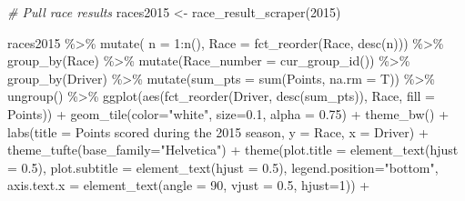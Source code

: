 \documentclass[
]{book}
\newenvironment{Shaded}{\begin{snugshade}}{\end{snugshade}}
\newcommand{\AttributeTok}[1]{\textcolor[rgb]{0.77,0.63,0.00}{#1}}
\newcommand{\CommentTok}[1]{\textcolor[rgb]{0.56,0.35,0.01}{\textit{#1}}}
\newcommand{\DecValTok}[1]{\textcolor[rgb]{0.00,0.00,0.81}{#1}}
\newcommand{\FloatTok}[1]{\textcolor[rgb]{0.00,0.00,0.81}{#1}}
\newcommand{\FunctionTok}[1]{\textcolor[rgb]{0.00,0.00,0.00}{#1}}
\newcommand{\NormalTok}[1]{#1}
\newcommand{\OtherTok}[1]{\textcolor[rgb]{0.56,0.35,0.01}{#1}}
\newcommand{\SpecialCharTok}[1]{\textcolor[rgb]{0.00,0.00,0.00}{#1}}
\newcommand{\StringTok}[1]{\textcolor[rgb]{0.31,0.60,0.02}{#1}}
\begin{document}
\begin{Shaded}
\begin{Highlighting}[]
\CommentTok{\# Pull race results}
\NormalTok{races2015 }\OtherTok{\textless{}{-}} \FunctionTok{race\_result\_scraper}\NormalTok{(}\DecValTok{2015}\NormalTok{)}

\NormalTok{races2015 }\SpecialCharTok{\%\textgreater{}\%}
  \FunctionTok{mutate}\NormalTok{( }\AttributeTok{n =} \DecValTok{1}\SpecialCharTok{:}\FunctionTok{n}\NormalTok{(),}
          \AttributeTok{Race =} \FunctionTok{fct\_reorder}\NormalTok{(Race, }\FunctionTok{desc}\NormalTok{(n))) }\SpecialCharTok{\%\textgreater{}\%}
  \FunctionTok{group\_by}\NormalTok{(Race) }\SpecialCharTok{\%\textgreater{}\%} 
  \FunctionTok{mutate}\NormalTok{(}\AttributeTok{Race\_number =} \FunctionTok{cur\_group\_id}\NormalTok{()) }\SpecialCharTok{\%\textgreater{}\%}
  \FunctionTok{group\_by}\NormalTok{(Driver) }\SpecialCharTok{\%\textgreater{}\%} 
  \FunctionTok{mutate}\NormalTok{(}\AttributeTok{sum\_pts =} \FunctionTok{sum}\NormalTok{(Points, }\AttributeTok{na.rm =}\NormalTok{ T)) }\SpecialCharTok{\%\textgreater{}\%}
  \FunctionTok{ungroup}\NormalTok{() }\SpecialCharTok{\%\textgreater{}\%} 
  \FunctionTok{ggplot}\NormalTok{(}\FunctionTok{aes}\NormalTok{(}\FunctionTok{fct\_reorder}\NormalTok{(Driver, }\FunctionTok{desc}\NormalTok{(sum\_pts)), Race, }\AttributeTok{fill =}\NormalTok{ Points)) }\SpecialCharTok{+}
  \FunctionTok{geom\_tile}\NormalTok{(}\AttributeTok{color=}\StringTok{"white"}\NormalTok{, }\AttributeTok{size=}\FloatTok{0.1}\NormalTok{, }\AttributeTok{alpha =} \FloatTok{0.75}\NormalTok{) }\SpecialCharTok{+}
  \FunctionTok{theme\_bw}\NormalTok{() }\SpecialCharTok{+}
  \FunctionTok{labs}\NormalTok{(}\AttributeTok{title =} \StringTok{\textquotesingle{}Points scored during the 2015 season\textquotesingle{}}\NormalTok{,}
       \AttributeTok{y =} \StringTok{\textquotesingle{}Race\textquotesingle{}}\NormalTok{,}
       \AttributeTok{x =} \StringTok{\textquotesingle{}Driver\textquotesingle{}}\NormalTok{) }\SpecialCharTok{+} 
  \FunctionTok{theme\_tufte}\NormalTok{(}\AttributeTok{base\_family=}\StringTok{"Helvetica"}\NormalTok{)  }\SpecialCharTok{+}
  \FunctionTok{theme}\NormalTok{(}\AttributeTok{plot.title =} \FunctionTok{element\_text}\NormalTok{(}\AttributeTok{hjust =} \FloatTok{0.5}\NormalTok{),}
        \AttributeTok{plot.subtitle =} \FunctionTok{element\_text}\NormalTok{(}\AttributeTok{hjust =} \FloatTok{0.5}\NormalTok{),}
        \AttributeTok{legend.position=}\StringTok{"bottom"}\NormalTok{,}
        \AttributeTok{axis.text.x =} \FunctionTok{element\_text}\NormalTok{(}\AttributeTok{angle =} \DecValTok{90}\NormalTok{, }\AttributeTok{vjust =} \FloatTok{0.5}\NormalTok{, }\AttributeTok{hjust=}\DecValTok{1}\NormalTok{)) }\SpecialCharTok{+}

\end{Highlighting}
\end{Shaded}
\end{document}
